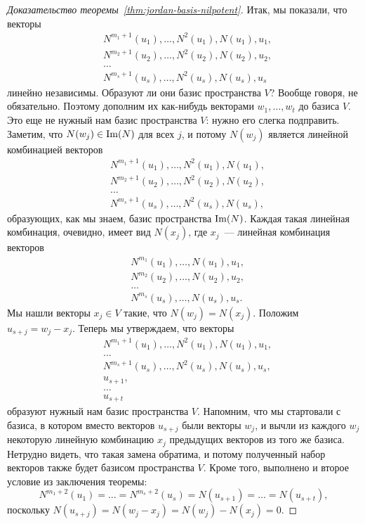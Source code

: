 \begin{proof}[Доказательство теоремы~\ref{thm:jordan-basis-nilpotent}]
Итак, мы показали, что векторы
\begin{align*}
& N^{m_1+1}(u_1),\dots,N^2(u_1),N(u_1),u_1, \\
& N^{m_2+1}(u_2),\dots,N^2(u_2),N(u_2),u_2, \\
& \dots \\
& N^{m_s+1}(u_s),\dots,N^2(u_s),N(u_s),u_s
\end{align*}
линейно независимы. Образуют ли они базис пространства $V$? Вообще говоря,
не обязательно. Поэтому дополним их как-нибудь векторами $w_1,\dots,w_t$
до базиса $V$. Это еще не нужный нам базис пространства $V$: нужно его
слегка подправить. Заметим, что $N(w_j)\in\operatorname{Im}(N)$ для всех $j$,
и потому $N(w_j)$ является линейной комбинацией векторов
\begin{align*}
& N^{m_1+1}(u_1),\dots,N^2(u_1),N(u_1), \\
& N^{m_2+1}(u_2),\dots,N^2(u_2),N(u_2), \\
& \dots \\
& N^{m_s+1}(u_s),\dots,N^2(u_s),N(u_s),
\end{align*}
образующих, как мы знаем, базис пространства $\operatorname{Im}(N)$.
Каждая такая линейная комбинация, очевидно, имеет вид $N(x_j)$, где $x_j$~---
линейная комбинация векторов
\begin{align*}
& N^{m_1}(u_1),\dots,N(u_1),u_1, \\
& N^{m_2}(u_2),\dots,N(u_2),u_2, \\
& \dots \\
& N^{m_s}(u_s),\dots,N(u_s),u_s.
\end{align*}
Мы нашли векторы $x_j\in V$ такие, что $N(w_j) = N(x_j)$.
Положим $u_{s+j} = w_j - x_j$.
Теперь мы утверждаем, что векторы
\begin{align*}
& N^{m_1+1}(u_1),\dots,N^2(u_1),N(u_1),u_1, \\
& \dots \\
& N^{m_s+1}(u_s),\dots,N^2(u_s),N(u_s),u_s, \\
& u_{s+1}, \\
& \dots \\
& u_{s+t}
\end{align*}
образуют нужный нам базис пространства $V$.
Напомним, что мы стартовали с базиса, в котором вместо
векторов $u_{s+j}$ были векторы $w_j$, и вычли из каждого $w_j$
некоторую линейную комбинацию $x_j$ предыдущих векторов из того же базиса.
Нетрудно видеть, что такая замена обратима, и потому полученный набор
векторов также будет базисом пространства $V$.
Кроме того, выполнено и второе условие из заключения теоремы:
$$
N^{m_1+2}(u_1) = \dots = N^{m_s+2}(u_s) = N(u_{s+1}) = \dots = N(u_{s+t}),
$$
поскольку $N(u_{s+j}) = N(w_j-x_j) = N(w_j)-N(x_j) = 0$.
\end{proof}

